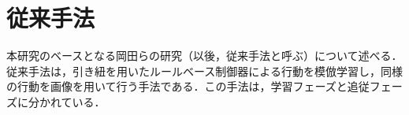 \chapter{従来手法}

  本研究のベースとなる岡田らの研究（以後，従来手法と呼ぶ）について述べる．従来手法は，引き紐を用いたルールベース制御器による行動を模倣学習し，同様の行動を画像を用いて行う手法である．この手法は，学習フェーズと追従フェーズに分かれている．

\label{chap:trajectory}
%





%
